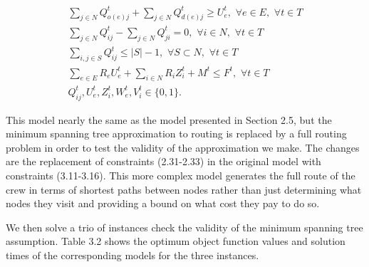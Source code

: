 \begin{eqnarray}
\sum_{j \in N} Q_{o(e)j}^t + \sum_{j \in N} Q_{d(e)j}^t \geq U_e^t, \hspace{4pt} \forall e \in E, \hspace{4pt} \forall t \in T\\
\sum_{j \in N} Q_{ij}^t - \sum_{j \in N} Q_{ji}^t = 0, \hspace{4pt} \forall i \in N, \hspace{4pt} \forall t \in T\\
\sum_{i,j \in S} Q_{ij}^t \leq |S|-1, \hspace{4pt} \forall S \subset N, \hspace{4pt} \forall t \in T\\
\sum_{e \in E} R_{e}U_e^t + \sum_{i \in N}R_{i}Z_i^t + M^t \leq F^t, \hspace{4pt} \forall t \in T\\
Q_{ij}^t,U_{e}^t,Z_{i}^t,W_{e}^t,V_{i}^t \in \{0,1\}. 
\end{eqnarray}

This model nearly the same as the model presented in Section 2.5, but the minimum spanning tree approximation to routing is replaced by a full routing problem in order to test the validity of the approximation we make. The changes are the replacement of constraints (2.31-2.33) in the original model with constraints (3.11-3.16). This more complex model generates the full route of the crew in terms of shortest paths between nodes rather than just determining what nodes they visit and providing a bound on what cost they pay to do so. 

We then solve a trio of instances check the validity of the minimum spanning tree assumption. Table 3.2 shows the optimum object function values and solution times of the corresponding models for the three instances. 
\begin{table}[htbp]
	\centering
	\caption{Runtime and objective values for minimum spanning tree and routing versions of the power repair problem}
	
	\label{time}
\end{table}

